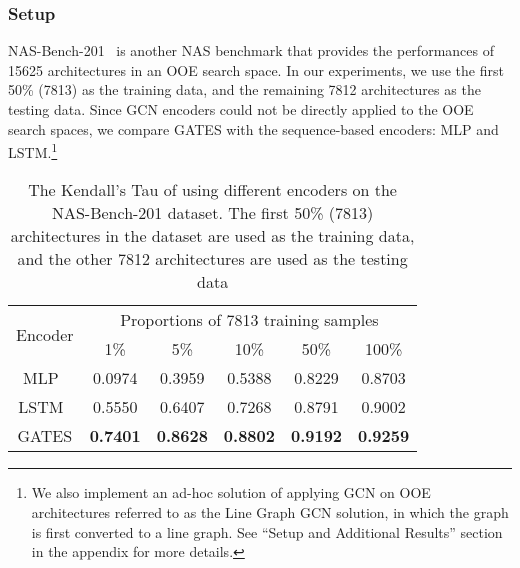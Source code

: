 \documentclass[runningheads]{llncs}
\begin{document}
\subsubsection{Setup}
NAS-Bench-201~\cite{Dong2020NAS-Bench-201} is another NAS benchmark that provides the performances of 
15625 architectures in an OOE search space. In our experiments, we use the first 50\% (7813) as the training data, and the remaining 7812 architectures as the testing data.
Since GCN encoders could not be directly applied to the OOE search spaces, 
we compare GATES with the sequence-based encoders: MLP and LSTM.\footnote{We also implement an ad-hoc solution of applying GCN on OOE architectures referred to as the Line Graph GCN solution, in which the graph is first converted to a line graph. See ``Setup and Additional Results'' section in the appendix for more details.} 

\addtolength{\tabcolsep}{1pt}
\begin{table*}[tb]
\caption{The Kendall’s Tau of using different encoders on the NAS-Bench-201 dataset. The first 50\% (7813) architectures in the dataset are used as the training data, and the other 7812 architectures are used as the testing data}
\label{table:gates-nb201}
\begin{center}
\begin{tabular}{cccccc}
\toprule
\multirow{2}{*}{Encoder} & \multicolumn{5}{c}{Proportions of 7813 training samples}\\ 
\cmidrule(lr){2-6} & 1\% & 5\% & 10\% & 50\% & 100\% \\\midrule
MLP~\cite{wang2018alphax}   &  0.0974 & 0.3959 & 0.5388 & 0.8229 & 0.8703\\
  LSTM~\cite{wang2018alphax}  & 0.5550 & 0.6407 & 0.7268 & 0.8791 & 0.9002\\
\hline
GATES & {\bf 0.7401} & {\bf 0.8628} & {\bf 0.8802} & {\bf 0.9192} & {\bf 0.9259}\\\bottomrule
\end{tabular}
\end{center}
\end{table*}
\addtolength{\tabcolsep}{-1pt}
\end{document}

